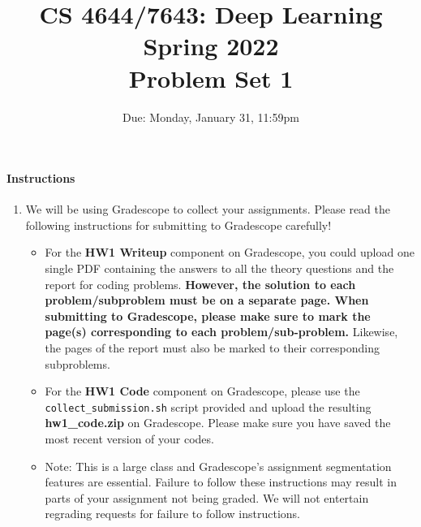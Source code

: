 \documentclass[11pt,english]{article}
\begin{document}
\title{CS 4644/7643: Deep Learning\\
Spring 2022 \\
Problem Set 1}


\date{Due: Monday, January 31, 11:59pm}
\maketitle

\paragraph*{Instructions}
\begin{enumerate}
\item We will be using Gradescope to collect your assignments.  Please read the following instructions for submitting to Gradescope carefully!
     \begin{itemize}
          \item
               For the \textbf{HW1 Writeup} component on Gradescope, you could upload one single PDF containing the answers to all the theory questions and the report for coding problems. \textbf{However, the solution to each problem/subproblem must be on a separate page. When submitting to Gradescope, please make sure to mark the page(s) corresponding to each problem/sub-problem.} Likewise, the pages of the report must also be marked to their corresponding subproblems.
          \item
               For the \textbf{HW1 Code} component on Gradescope, 
               please use the \texttt{collect\_submission.sh} script provided and upload the resulting \textbf{hw1\_code.zip} on Gradescope. Please make sure you have saved the most recent version of your codes.
          \item
               Note: This is a large class and Gradescope's assignment segmentation features are essential.
               Failure to follow these instructions may result in parts of your assignment not being graded.
               We will not entertain regrading requests for failure to follow instructions.

     \end{itemize}


\end{enumerate}
\end{document}
